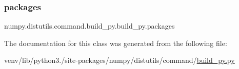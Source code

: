 \subsubsection{\texorpdfstring{packages}{packages}}
{\footnotesize\ttfamily numpy.\+distutils.\+command.\+build\+\_\+py.\+build\+\_\+py.\+packages}



The documentation for this class was generated from the following file\+:\begin{DoxyCompactItemize}
\item 
venv/lib/python3./site-\/packages/numpy/distutils/command/\hyperlink{numpy_2distutils_2command_2build__py_8py}{build\+\_\+py.\+py}\end{DoxyCompactItemize}

